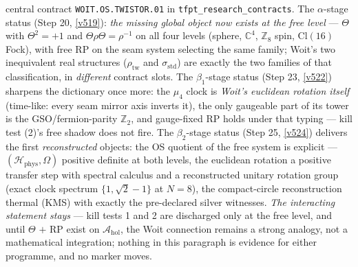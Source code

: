 \documentclass[11pt,a4paper]{article}
\newcommand{\Z}{\mathbb{Z}}
\theoremstyle{definition}
\begin{document}
central contract \texttt{WOIT.OS.TWISTOR.01} in \texttt{tfpt\_research\_contracts}. The
$\alpha$-stage status (Step 20, \vref{v519}): \emph{the missing global object now exists at the
free level} --- $\Theta$ with $\Theta^2=+1$ and $\Theta\rho\Theta=\rho^{-1}$ on all four levels
(sphere, $\mathbb C^4$, $\Z_8$ spin, $\mathrm{Cl}(16)$ Fock), with free RP on the seam system selecting
the same family; Woit's two inequivalent real structures ($\rho_{\mathrm{tw}}$ and
$\sigma_{\mathrm{std}}$) are exactly the two families of that classification, in \emph{different}
contract slots. The $\beta_1$-stage status (Step 23, \vref{v522}) sharpens the dictionary once
more: the $\mu_4$ clock is \emph{Woit's euclidean rotation itself} (time-like: every seam mirror
axis inverts it), the only gaugeable part of its tower is the GSO/fermion-parity $\Z_2$, and
gauge-fixed RP holds under that typing --- kill test (2)'s free shadow does not fire.
The $\beta_2$-stage status (Step 25, \vref{v524}) delivers the first \emph{reconstructed}
objects: the OS quotient of the free system is explicit ---
$(\mathcal H_{\mathrm{phys}}, \Omega)$ positive definite at both levels, the euclidean
rotation a positive transfer step with spectral calculus and a reconstructed unitary rotation
group (exact clock spectrum $\{1, \sqrt2-1\}$ at $N = 8$), the compact-circle reconstruction
thermal (KMS) with exactly the pre-declared silver witnesses.
\emph{The interacting statement stays \mO} --- kill tests 1 and 2 are discharged only at
the free level, and until $\Theta$ $+$ RP exist on $\mathcal A_{\mathrm{hol}}$, the Woit
connection remains a strong analogy, not a mathematical integration; nothing in this paragraph is
evidence for either programme, and no marker moves.

\end{document}
